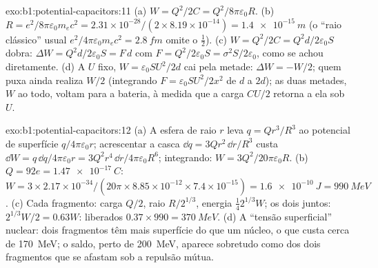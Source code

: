 \begin{solution}{exo:b1:potential-capacitors:11}
(a) $W = Q^2/2C = Q^2/8\pi\varepsilon_0R$. (b) $R = e^2/8\pi\varepsilon_0m_ec^2 = 2.31 \times
10^{-28}/(2 \times 8.19 \times 10^{-14}) = \qty{1.4e-15}{m}$ (o ``raio clássico''
usual $e^2/4\pi\varepsilon_0m_ec^2 = \qty{2.8}{fm}$ omite o $\tfrac12$). (c) $W =
Q^2/2C = Q^2d/2\varepsilon_0S$ dobra: $\Delta W = Q^2d/2\varepsilon_0S = F\,d$ com $F =
Q^2/2\varepsilon_0S = \sigma^2S/2\varepsilon_0$, como se achou diretamente. (d) A $U$ fixo, $W =
\varepsilon_0SU^2/2d$ cai pela metade: $\Delta W = -W/2$; quem puxa ainda realiza $W/2$
(integrando $F = \varepsilon_0SU^2/2x^2$ de $d$ a $2d$); as duas metades, $W$ ao
todo, voltam para a bateria, à medida que a carga $CU/2$ retorna a ela sob
 $U$.
\end{solution}

\begin{solution}{exo:b1:potential-capacitors:12}
(a) A esfera de raio $r$ leva $q = Qr^3/R^3$ ao potencial de superfície
$q/4\pi\varepsilon_0r$; acrescentar a casca $\dd q = 3Qr^2\,\dd r/R^3$ custa $\dd W =
q\,\dd q/4\pi\varepsilon_0r = 3Q^2r^4\,\dd r/4\pi\varepsilon_0R^6$; integrando: $W =
3Q^2/20\pi\varepsilon_0R$. (b) $Q = 92e = \qty{1.47e-17}{C}$: $W = 3 \times 2.17 \times
10^{-34}/(20\pi \times 8.85 \times 10^{-12} \times 7.4 \times 10^{-15}) = \qty{1.6e-10}{J}
= \qty{990}{MeV}$. (c) Cada fragmento: carga $Q/2$, raio $R/2^{1/3}$,
energia $\tfrac14 2^{1/3}W$; os dois juntos: $2^{1/3}W/2 = 0.63W$: liberados
$0.37 \times 990 = \qty{370}{MeV}$. (d) A ``tensão superficial'' nuclear:
dois fragmentos têm mais superfície do que um núcleo, o que custa cerca de
\qty{170}{MeV}; o saldo, perto de \qty{200}{MeV}, aparece sobretudo como
 dos dois fragmentos que se afastam sob a repulsão mútua.
\end{solution}

